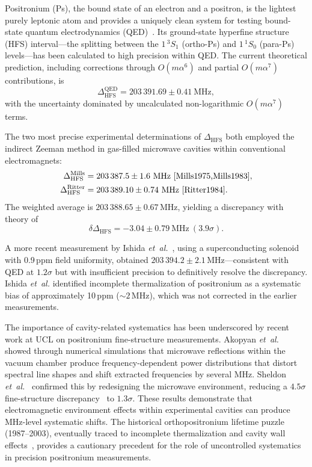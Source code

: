 \documentclass[twocolumn,pra,aps,superscriptaddress,floatfix,10pt]{revtex4-2}
\begin{document}
Positronium (Ps), the bound state of an electron and a positron, is the lightest purely leptonic atom and provides a uniquely clean system for testing bound-state quantum electrodynamics (QED)~\cite{Adkins2022,Karshenboim2005}. Its ground-state hyperfine structure (HFS) interval---the splitting between the $1\,^3S_1$ (ortho-Ps) and $1\,^1S_0$ (para-Ps) levels---has been calculated to high precision within QED. The current theoretical prediction, including corrections through $O(m\alpha^6)$ and partial $O(m\alpha^7)$ contributions, is~\cite{Kniehl2000,Melnikov2001,Baker2014}
\begin{equation}
  \Delta_\mathrm{HFS}^\mathrm{QED} = 203\,391.69 \pm 0.41~\mathrm{MHz},
  \label{eq:qed}
\end{equation}
with the uncertainty dominated by uncalculated non-logarithmic $O(m\alpha^7)$ terms.

The two most precise experimental determinations of $\Delta_\mathrm{HFS}$ both employed the indirect Zeeman method in gas-filled microwave cavities within conventional electromagnets:
\begin{align}
  \Delta_\mathrm{HFS}^\mathrm{Mills} &= 203\,387.5 \pm 1.6~\mathrm{MHz}~\cite{Mills1975,Mills1983}, \\
  \Delta_\mathrm{HFS}^\mathrm{Ritter} &= 203\,389.10 \pm 0.74~\mathrm{MHz}~\cite{Ritter1984}.
\end{align}
The weighted average is $203\,388.65 \pm 0.67$\,MHz, yielding a discrepancy with theory of
\begin{equation}
  \delta\Delta_\mathrm{HFS} = -3.04 \pm 0.79~\mathrm{MHz}~(3.9\sigma).
  \label{eq:discrepancy}
\end{equation}

A more recent measurement by Ishida \textit{et~al.}~\cite{Ishida2014}, using a superconducting solenoid with 0.9\,ppm field uniformity, obtained $203\,394.2 \pm 2.1$\,MHz---consistent with QED at $1.2\sigma$ but with insufficient precision to definitively resolve the discrepancy. Ishida \textit{et~al.} identified incomplete thermalization of positronium as a systematic bias of approximately 10\,ppm ($\sim 2$\,MHz), which was not corrected in the earlier measurements.

The importance of cavity-related systematics has been underscored by recent work at UCL on positronium fine-structure measurements. Akopyan \textit{et~al.}~\cite{Akopyan2021} showed through numerical simulations that microwave reflections within the vacuum chamber produce frequency-dependent power distributions that distort spectral line shapes and shift extracted frequencies by several MHz. Sheldon \textit{et~al.}~\cite{Sheldon2023} confirmed this by redesigning the microwave environment, reducing a $4.5\sigma$ fine-structure discrepancy~\cite{Gurung2020} to $1.3\sigma$. These results demonstrate that electromagnetic environment effects within experimental cavities can produce MHz-level systematic shifts. The historical orthopositronium lifetime puzzle (1987--2003), eventually traced to incomplete thermalization and cavity wall effects~\cite{Vallery2003}, provides a cautionary precedent for the role of uncontrolled systematics in precision positronium measurements.
\end{document}
